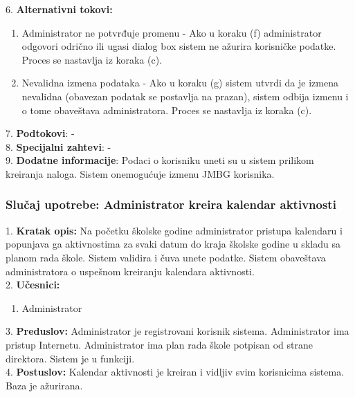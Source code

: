 \documentclass{article}
\begin{document}
6. \textbf{Alternativni tokovi:}
\begin{enumerate} [label=(\roman*)]
    \item Administrator ne potvrđuje promenu - Ako u koraku (f) administrator odgovori odrično ili ugasi dialog box sistem ne ažurira korisničke podatke. Proces se nastavlja iz koraka (c).
    \item Nevalidna izmena podataka - Ako u koraku (g) sistem utvrdi da je izmena nevalidna (obavezan podatak se postavlja na prazan), sistem odbija izmenu i o tome obaveštava administratora. Proces se nastavlja iz koraka (c).
\end{enumerate}

7. \textbf{Podtokovi}: - \\

8. \textbf{Specijalni zahtevi}: - \\

9. \textbf{Dodatne informacije}: Podaci o korisniku uneti su u sistem prilikom kreiranja naloga. Sistem onemogućuje izmenu JMBG korisnika. \\

\subsubsection{Slučaj upotrebe: Administrator kreira kalendar aktivnosti}
1. \textbf{Kratak opis:} Na početku školske godine administrator pristupa kalendaru i popunjava ga aktivnostima za svaki datum do kraja školske godine u skladu sa planom rada škole. Sistem validira i čuva unete podatke. Sistem obaveštava administratora o uspešnom kreiranju kalendara aktivnosti. \\ 

2. \textbf{Učesnici:}
\begin{enumerate} [label=(\alph*)]
\item Administrator
\end{enumerate} 

3. \textbf{Preduslov:} Administrator je registrovani korisnik sistema. Administrator ima pristup Internetu. Administrator ima plan rada škole potpisan od strane direktora. Sistem je u funkciji. \\

4. \textbf{Postuslov:} Kalendar aktivnosti je kreiran i vidljiv svim korisnicima sistema. Baza je ažurirana. \\
\end{document}
